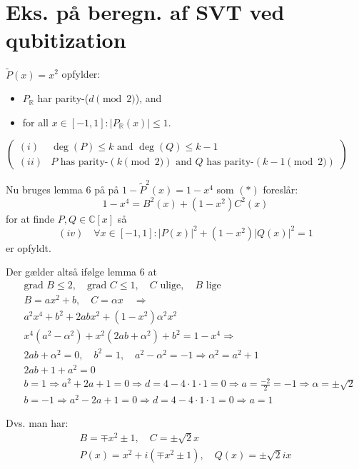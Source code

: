 \documentclass[11pt,a4paper]{article}
\begin{document}
\section*{Eks. på beregn. af SVT ved qubitization}

$\tilde{P}(x) = x^2$ opfylder:
\begin{itemize}
    \item $P_{\mathbb{R}}$ har parity-($d \pmod 2$), and
    \item for all $x \in [-1, 1]: |P_{\mathbb{R}}(x)| \leq 1$.
\end{itemize}
\hfill $\left( \begin{smallmatrix} (i) & \deg(P) \leq k \text{ and } \deg(Q) \leq k-1 \\ (ii) & P \text{ has parity-}(k \pmod 2) \text{ and } Q \text{ has parity-}(k-1 \pmod 2) \end{smallmatrix} \right)$

Nu bruges lemma 6 på på $1 - \tilde{P}^2(x) = 1 - x^4$ som $(*)$ foreslår:
\[ 1 - x^4 = B^2(x) + (1 - x^2) C^2(x) \]
for at finde $P, Q \in \mathbb{C}[x]$ så
\[ (iv) \quad \forall x \in [-1, 1] : |P(x)|^2 + (1 - x^2)|Q(x)|^2 = 1 \]
er opfyldt.

Der gælder altså ifølge lemma 6 at
\begin{align*}
    &\text{grad } B \leq 2, \quad \text{grad } C \leq 1, \quad C \text{ ulige}, \quad B \text{ lige} \\
    &B = ax^2 + b, \quad C = \alpha x \quad \Rightarrow \\
    &a^2x^4 + b^2 + 2abx^2 + (1 - x^2) \alpha^2 x^2 \\
    &x^4(a^2 - \alpha^2) + x^2(2ab + \alpha^2) + b^2 = 1 - x^4 \Rightarrow \\
    &2ab + \alpha^2 = 0, \quad b^2 = 1, \quad a^2 - \alpha^2 = -1 \Rightarrow \alpha^2 = a^2 + 1 \\
    &2ab + 1 + a^2 = 0 \\
    &b = 1 \Rightarrow a^2 + 2a + 1 = 0 \Rightarrow d = 4 - 4 \cdot 1 \cdot 1 = 0 \Rightarrow a = \frac{-2}{2} = -1 \Rightarrow \alpha = \pm \sqrt{2} \\
    &b = -1 \Rightarrow a^2 - 2a + 1 = 0 \Rightarrow d = 4 - 4 \cdot 1 \cdot 1 = 0 \Rightarrow a = 1
\end{align*}

Dvs. man har:
\begin{gather*}
    B = \mp x^2 \pm 1, \quad C = \pm \sqrt{2}x \\
    P(x) = x^2 + i(\mp x^2 \pm 1), \quad Q(x) = \pm \sqrt{2}i x
\end{gather*}
\end{document}
